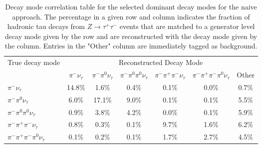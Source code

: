 
\begin{table}[htp]
   \centering
   \begin{tabular}{l|cccccc}

\multirow{2}{*}{True decay mode} & \multicolumn{6}{c}{Reconstructed Decay Mode}\\

 & $\pi^{-}\nu_\tau$ & $\pi^{-}\pi^0\nu_\tau$ & $\pi^{-}\pi^0\pi^0\nu_\tau$ & $\pi^{-}\pi^{+}\pi^{-}\nu_\tau$ & $\pi^{-}\pi^{+}\pi^{-}\pi^0\nu_\tau$& Other \\
\hline
$\pi^{-}\nu_\tau$ & 14.8\% &1.6\% &0.4\% &0.1\% &0.0\% & 0.7\% \\
$\pi^{-}\pi^0\nu_\tau$ & 6.0\% &17.1\% &9.0\% &0.1\% &0.1\% & 5.5\% \\
$\pi^{-}\pi^0\pi^0\nu_\tau$ & 0.9\% &3.8\% &4.2\% &0.0\% &0.1\% & 5.9\% \\
$\pi^{-}\pi^{+}\pi^{-}\nu_\tau$ & 0.8\% &0.3\% &0.1\% &9.7\% &1.6\% & 6.2\% \\
$\pi^{-}\pi^{+}\pi^{-}\pi^0\nu_\tau$ & 0.1\% &0.2\% &0.1\% &1.7\% &2.7\% & 4.5\% \\

\end{tabular}
\label{tab:dmResolutionNoNothing} \caption[Decay mode performance -- naive
reconstruction]{Decay mode correlation table for the selected dominant decay
modes for the naive approach.  The percentage in a given row and column
indicates the fraction of hadronic tau decays from
$Z\rightarrow\tau^{+}\tau^{-}$ events that are matched to a generator level
decay mode given by the row and are reconstructed with the decay mode given by
the column.  Entries in the "Other" column are immediately tagged as background.
}
\end{table}
